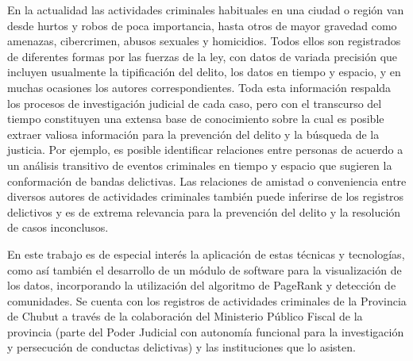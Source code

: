 
En la actualidad las actividades criminales habituales en una ciudad o región van desde hurtos y robos de poca importancia, hasta otros de mayor gravedad como amenazas, cibercrimen, abusos sexuales y  homicidios. Todos ellos son registrados de diferentes formas por las fuerzas de la ley, con datos de variada precisión que incluyen usualmente la tipificación del delito, los datos en tiempo y espacio, y en muchas ocasiones los autores correspondientes.
Toda esta información respalda los procesos de investigación judicial de cada caso, pero con el transcurso del tiempo constituyen una extensa base de conocimiento sobre la cual es posible extraer valiosa información para la prevención del delito y la búsqueda de la justicia. Por ejemplo, es posible identificar relaciones entre personas de acuerdo a un análisis transitivo de eventos criminales en tiempo y espacio que sugieren la conformación de bandas delictivas. Las relaciones de amistad o conveniencia entre diversos autores de actividades criminales también puede inferirse de los registros delictivos y es de extrema relevancia para la prevención del delito y la resolución de casos inconclusos.

En este trabajo es de especial interés la aplicación de estas técnicas y tecnologías, como así también el desarrollo de un módulo de software para la visualización de los datos, incorporando la utilización del algoritmo de PageRank y detección de comunidades. Se cuenta con los registros de actividades criminales de la Provincia de Chubut a través de la colaboración del Ministerio Público Fiscal de la provincia (parte del Poder Judicial con autonomía funcional para la investigación y persecución de conductas delictivas) y las instituciones que lo asisten.